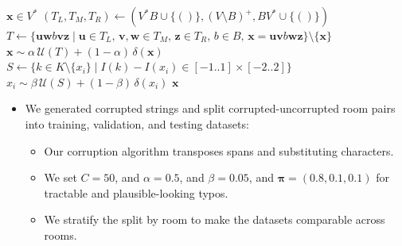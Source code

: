 \documentclass[aspectratio=169,notheorems,10pt]{beamer}
\theoremstyle{definition}
\begin{document}
\begin{frame}
\begin{algorithm}[H]
	\caption{$\textsc{Corrupt}(\bm{x})$}
	\begin{algorithmic}
		\Require $\bm{x}\in V^{*}$
		\State ${
			(T_{L},T_{M},T_{R})
			\gets
			(V^{*}B\cup\{()\},(V\setminus B)^{+},BV^{*}\cup\{()\})
		}$
		\State ${
			T
			\gets
			\{
				\bm{u}\bm{w}b\bm{v}\bm{z}
				\mid
				\bm{u}\in T_{L},\,
				\bm{v},\bm{w}\in T_{M},\,
				\bm{z}\in T_{R},\,
				b\in B,\,
				\bm{x}=\bm{u}\bm{v}b\bm{w}\bm{z}
			\}
			\setminus
			\{\bm{x}\}
		}$
			${\bm{x}\sim\alpha\,\mathcal{U}(T)+(1-\alpha)\,\delta(\bm{x})}$
		\EndIf
			\State ${
				S
				\gets
				\{
					k\in K
					\setminus
					\{x_{i}\}
					\mid
					I(k)-I(x_{i})
					\in
					[-1..1]
					\times
					[-2..2]
				\}
			}$
				${x_{i}\sim\beta\,\mathcal{U}(S)+(1-\beta)\,\delta(x_{i})}$
			\EndIf
		\EndFor
		\State \Return $\bm{x}$
	\end{algorithmic}
\end{algorithm}
\begin{itemize}
	\item We generated corrupted strings and split corrupted-uncorrupted room pairs into training, validation, and testing datasets:
	\begin{itemize}
		\item Our corruption algorithm transposes spans and substituting characters.
		\item We set $C=50$, and $\alpha=0.5$, and $\beta=0.05$, and $\bm{\pi}=(0.8,0.1,0.1)$ for tractable and plausible-looking typos.
		\item We stratify the split by room to make the datasets comparable across rooms.
	\end{itemize}
\end{itemize}
\end{frame}
\end{document}
